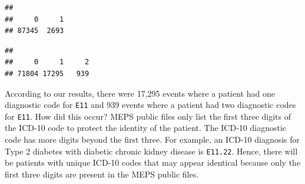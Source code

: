 \documentclass[
]{book}
\newenvironment{Shaded}{\begin{snugshade}}{\end{snugshade}}
\newcommand{\AttributeTok}[1]{\textcolor[rgb]{0.77,0.63,0.00}{#1}}
\newcommand{\ConstantTok}[1]{\textcolor[rgb]{0.00,0.00,0.00}{#1}}
\newcommand{\DecValTok}[1]{\textcolor[rgb]{0.00,0.00,0.81}{#1}}
\newcommand{\DocumentationTok}[1]{\textcolor[rgb]{0.56,0.35,0.01}{\textbf{\textit{#1}}}}
\newcommand{\FunctionTok}[1]{\textcolor[rgb]{0.00,0.00,0.00}{#1}}
\newcommand{\NormalTok}[1]{#1}
\newcommand{\OtherTok}[1]{\textcolor[rgb]{0.56,0.35,0.01}{#1}}
\newcommand{\SpecialCharTok}[1]{\textcolor[rgb]{0.00,0.00,0.00}{#1}}
\newcommand{\StringTok}[1]{\textcolor[rgb]{0.31,0.60,0.02}{#1}}
\begin{document}
\begin{Shaded}
\end{Shaded}

\begin{verbatim}
## 
##     0     1 
## 87345  2693
\end{verbatim}

\begin{Shaded}
\end{Shaded}

\begin{verbatim}
## 
##     0     1     2 
## 71804 17295   939
\end{verbatim}

According to our results, there were 17,295 events where a patient had one diagnostic code for \texttt{E11} and 939 events where a patient had two diagnostic codes for \texttt{E11}. How did this occur? MEPS public files only list the first three digits of the ICD-10 code to protect the identity of the patient. The ICD-10 diagnostic code has more digits beyond the first three. For example, an ICD-10 diagnosis for Type 2 diabetes with diabetic chronic kidney disease is \texttt{E11.22}. Hence, there will be patients with unique ICD-10 codes that may appear identical because only the first three digits are present in the MEPS public files.
\end{document}
